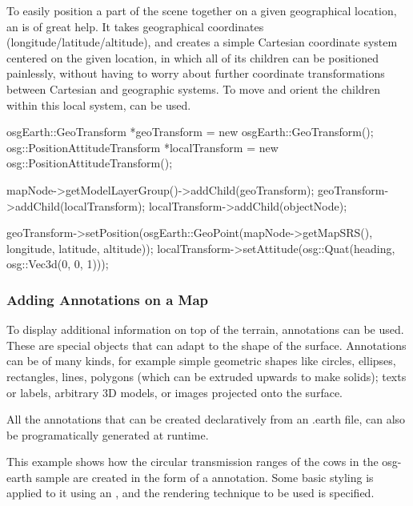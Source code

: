 To easily position a part of the scene together on a given geographical
location, an  is of great help. It takes
geographical coordinates (longitude/latitude/altitude), and creates a simple
Cartesian coordinate system centered on the given location, in which all of
its children can be positioned painlessly, without having to worry about
further coordinate transformations between Cartesian and geographic systems.
To move and orient the children within this local system,
 can be used.

\begin{cpp}
osgEarth::GeoTransform *geoTransform = new osgEarth::GeoTransform();
osg::PositionAttitudeTransform *localTransform = new osg::PositionAttitudeTransform();

mapNode->getModelLayerGroup()->addChild(geoTransform);
geoTransform->addChild(localTransform);
localTransform->addChild(objectNode);

geoTransform->setPosition(osgEarth::GeoPoint(mapNode->getMapSRS(), longitude, latitude, altitude));
localTransform->setAttitude(osg::Quat(heading, osg::Vec3d(0, 0, 1)));
\end{cpp}

\subsubsection{Adding Annotations on a Map}
\label{sec:graphics:osgearth-adding-annotations}

To display additional information on top of the terrain, annotations can be
used. These are special objects that can adapt to the shape of the surface.
Annotations can be of many kinds, for example simple geometric shapes like circles,
ellipses, rectangles, lines, polygons (which can be extruded upwards to make
solids); texts or labels, arbitrary 3D models, or images projected onto the
surface.

All the annotations that can be created declaratively from an .earth file,
can also be programatically generated at runtime.

This example shows how the circular transmission ranges of the cows in the
osg-earth sample are created in the form of a
 annotation. Some basic styling is
applied to it using an , and the rendering technique to
be used is specified.

